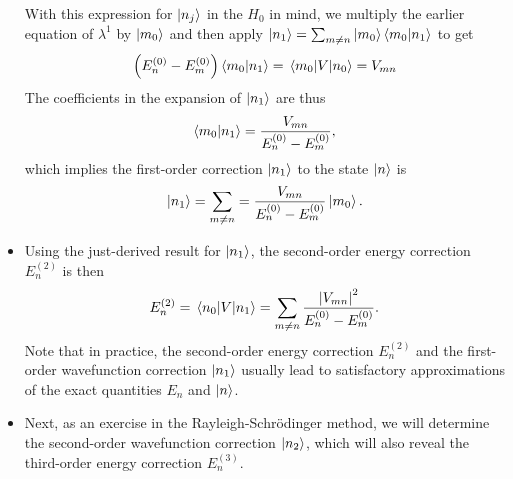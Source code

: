 \documentclass[11pt, a4paper]{article}
\newcommand{\Schro}{Schr\"{o}dinger\xspace}
\begin{document}
\begin{itemize}
    With this expression for $ \ket{n_{j}} $ in the $ H_{0} $ in mind, we multiply the earlier equation of $ \lambda^{1} $ by $ \ket{m_{0}} $ and then apply $ \ket{n_{1}} = \sum_{m \neq n}\ket{m_{0}}\braket{m_{0}}{n_{1}} $ to get
    \begin{equation*}
        \left( E_{n}^{(0)} - E_{m}^{(0)} \right)\braket{m_{0}}{n_{1}} = \mel{m_{0}}{V}{n_{0}} = V_{mn}
    \end{equation*}
    The coefficients in the expansion of $ \ket{n_{1}} $ are thus
    \begin{equation*}
        \braket{m_{0}}{n_{1}} = \frac{V_{mn}}{E_{n}^{(0)} - E_{m}^{(0)}},
    \end{equation*}
    which implies the first-order correction $ \ket{n_{1}} $ to the state $ \ket{n} $ is
    \begin{equation*}
        \ket{n_{1}} = \sum_{m\neq n} = \frac{V_{mn}}{E_{n}^{(0)} - E_{m}^{(0)}} \ket{m_{0}}.
    \end{equation*}

    \item Using the just-derived result for $ \ket{n_{1}} $, the second-order energy correction $ E_{n}^{(2)} $ is then
    \begin{equation*}
        E_{n}^{(2)} = \mel{n_{0}}{V}{n_{1}} = \sum_{m \neq n} \frac{\abs{V_{mn}}^{2}}{E_{n}^{(0)} - E_{m}^{(0)}}.
    \end{equation*}
    Note that in practice, the second-order energy correction $ E_{n}^{(2)} $ and the first-order wavefunction correction $ \ket{n_{1}} $ usually lead to satisfactory approximations of the exact quantities $ E_{n} $ and $ \ket{n} $.

    \item Next, as an exercise in the Rayleigh-\Schro method, we will determine the second-order wavefunction correction $ \ket{n_{2}} $, which will also reveal the third-order energy correction $ E_{n}^{(3)} $. 


\end{itemize}
\end{document}

